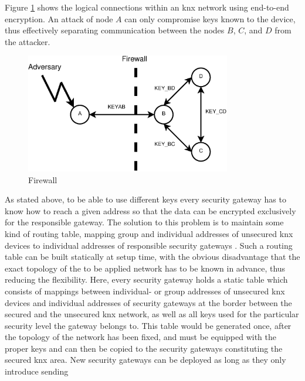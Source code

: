 Figure \ref{fig:firewall} shows the logical connections within an \gls{knx} network using end-to-end encryption. An 
attack of node $A$ can only compromise keys known to the device, thus effectively separating communication between the nodes $B$, $C$, and $D$ from
the attacker. 
\begin{figure}
  \centering
    \includegraphics[width=0.8\textwidth]{figures/firewall2.eps}
% 
 \caption{Firewall}
 \label{fig:firewall}
\end{figure}
As stated above, to be able to use different keys every security gateway has to know how to reach a given address so that the data can be encrypted
exclusively for the responsible gateway. The solution to this problem is to maintain some kind of routing table, mapping group and individual addresses of unsecured
\gls{knx} devices to individual addresses of responsible security gateways	.
Such a routing table can be built statically at setup time, with the obvious disadvantage
that the exact topology of the to be applied network has to be known in advance, thus reducing the flexibility. Here, every security gateway holds a static 
table which consists of mappings between individual- or group addresses of unsecured \gls{knx} devices and individual addresses of security gateways at the border
between the secured and the unsecured \gls{knx} network, as well as all keys used for the particular security level the gateway belongs to.
This table would be generated once, after the topology of the network has been fixed, and must be equipped with the proper keys and can then
be copied to the security gateways constituting the secured \gls{knx} area. New security gateways can be deployed as long as they only introduce sending 
